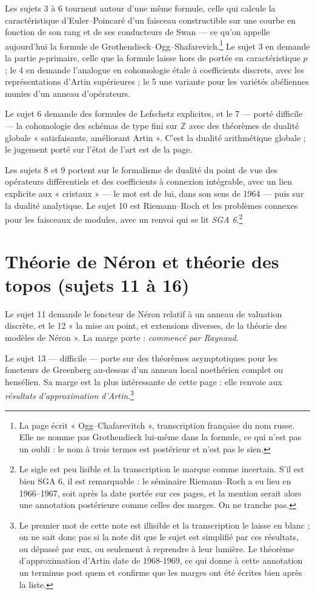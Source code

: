 \documentclass[11pt,a4paper]{article}
\begin{document}
Les sujets 3 à 6 tournent autour d'une même formule, celle qui calcule la
caractéristique d'Euler--Poincaré d'un faisceau constructible sur une courbe en
fonction de son rang et de ses conducteurs de Swan --- ce qu'on appelle
aujourd'hui la formule de Grothendieck--Ogg--Shafarevich.\footnote{La page écrit
« Ogg--Chafarevitch », transcription française du nom russe. Elle ne nomme pas
Grothendieck lui-même dans la formule, ce qui n'est pas un oubli : le nom à
trois termes est postérieur et n'est pas le sien.} Le sujet 3 en demande la
partie $p$-primaire, celle que la formule laisse hors de portée en
caractéristique $p$ ; le 4 en demande l'analogue en cohomologie étale à
coefficients discrets, avec les représentations d'Artin supérieures ; le 5 une
variante pour les variétés abéliennes munies d'un anneau d'opérateurs.

Le sujet 6 demande des formules de Lefschetz explicites, et le 7 --- porté
difficile --- la cohomologie des schémas de type fini sur $\mathbb{Z}$ avec des
théorèmes de dualité globale « satisfaisants, améliorant Artin ». C'est la
dualité arithmétique globale ; le jugement porté sur l'état de l'art est de la
page.

Les sujets 8 et 9 portent sur le formalisme de dualité du point de vue des
opérateurs différentiels et des coefficients à connexion intégrable, avec un
lien explicite aux « cristaux » --- le mot est de lui, dans son sens de 1964 ---
puis sur la dualité analytique. Le sujet 10 est Riemann--Roch et les problèmes
connexes pour les faisceaux de modules, avec un renvoi qui se lit
\emph{SGA 6}.\footnote{Le sigle est peu lisible et la transcription le marque
comme incertain. S'il est bien SGA 6, il est remarquable : le séminaire
Riemann--Roch a eu lieu en 1966--1967, soit après la date portée sur ces pages,
et la mention serait alors une annotation postérieure comme celles des marges.
On ne tranche pas.}

\section*{Théorie de Néron et théorie des topos (sujets 11 à 16)}

Le sujet 11 demande le foncteur de Néron relatif à un anneau de valuation
discrète, et le 12 « la mise au point, et extensions diverses, de la théorie des
modèles de Néron ». La marge porte : \emph{commencé par Raynaud}.

Le sujet 13 --- difficile --- porte sur des théorèmes asymptotiques pour les
foncteurs de Greenberg au-dessus d'un anneau local noethérien complet ou
hensélien. Sa marge est la plus intéressante de cette page : elle renvoie aux
\emph{résultats d'approximation d'Artin}.\footnote{Le premier mot de cette note
est illisible et la transcription le laisse en blanc ; on ne sait donc pas si la
note dit que le sujet est simplifié par ces résultats, ou dépassé par eux, ou
seulement à reprendre à leur lumière. Le théorème d'approximation d'Artin date
de 1968-1969, ce qui donne à cette annotation un terminus post quem et confirme
que les marges ont été écrites bien après la liste.}
\end{document}
